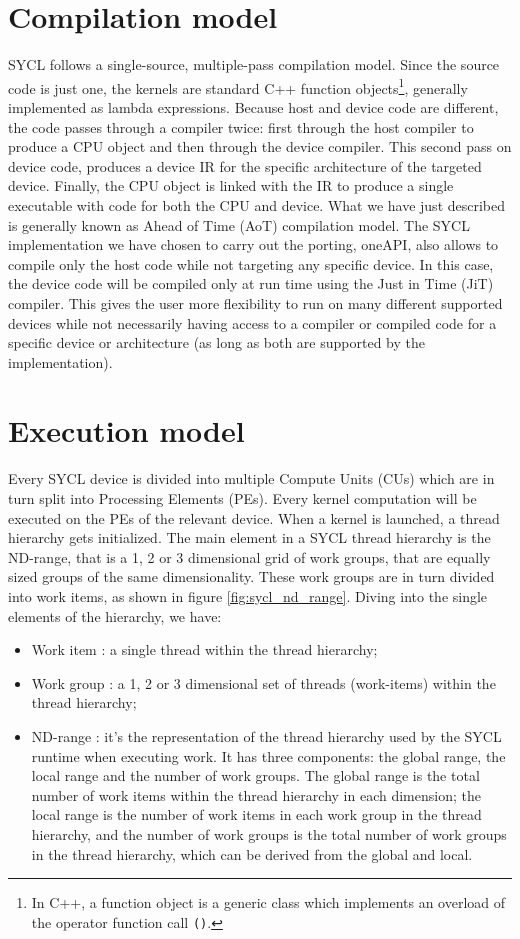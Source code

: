 \section{Compilation model}
\label{ch:compilation_model}
SYCL follows a single-source, multiple-pass compilation model. Since the source code is just one, the kernels are standard C++ function objects\footnote{In C++, a function object is a generic class which implements an overload of the operator function call \Verb "()".}, generally implemented as lambda expressions. Because host and device code are different, the code passes through a compiler twice: first through the host compiler to produce a CPU object and then through the device compiler. This second pass on device code, produces a device IR for the specific architecture of the targeted device. Finally, the CPU object is linked with the IR to produce a single executable with code for both the CPU and device. What we have just described is generally known as Ahead of Time (AoT) compilation model. The SYCL implementation we have chosen to carry out the porting, oneAPI, also allows to compile only the host code while not targeting any specific device. In this case, the device code will be compiled only at run time using the Just in Time (JiT) compiler. This gives the user more flexibility to run on many different supported devices while not necessarily having access to a compiler or compiled code for a specific device or architecture (as long as both are supported by the implementation).

\section{Execution model}
\label{ch:execution_model}
Every SYCL device is divided into multiple Compute Units (CUs) which are in turn split into Processing Elements (PEs). Every kernel computation will be executed on the PEs of the relevant device. When a kernel is launched, a thread hierarchy gets initialized. The main element in a SYCL thread hierarchy is the ND-range, that is a 1, 2 or 3 dimensional grid of work groups, that are equally sized groups of the same dimensionality. These work groups are in turn divided into work items, as shown in figure \ref{fig:sycl_nd_range}. Diving into the single elements of the hierarchy, we have:
\begin{itemize}
    \item Work item : a single thread within the thread hierarchy;
    \item Work group : a 1, 2 or 3 dimensional set of threads (work-items) within the thread hierarchy;
    \item ND-range : it's the representation of the thread hierarchy used by the SYCL runtime when executing work. It has three components: the global range, the local range and the number of work groups. The global range is the total number of work items within the thread hierarchy in each dimension; the local range is the number of work items in each work group in the thread hierarchy, and the number of work groups is the total number of work groups in the thread hierarchy, which can be derived from the global and local.
\end{itemize}


